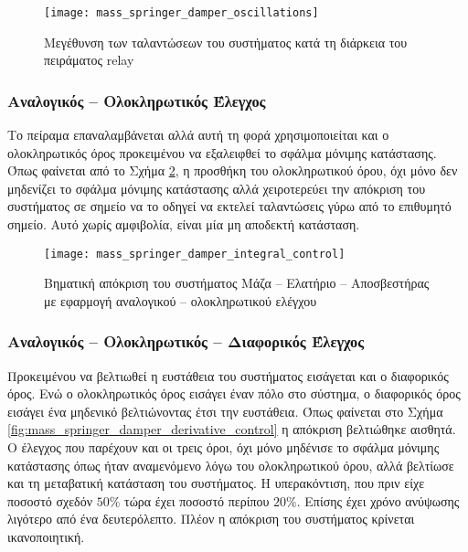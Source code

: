\begin{figure}[h]
  \centering
  \texttt{[image: mass\_springer\_damper\_oscillations]}
  \caption{Μεγέθυνση των ταλαντώσεων του συστήματος κατά τη διάρκεια του πειράματος relay}
  \label{fig:mass_springer_damper_oscillations}
\end{figure}

\subsubsection{Αναλογικός -- Ολοκληρωτικός Έλεγχος}

Το πείραμα επαναλαμβάνεται αλλά αυτή τη φορά χρησιμοποιείται και ο ολοκληρωτικός όρος προκειμένου να εξαλειφθεί το σφάλμα μόνιμης κατάστασης. Όπως φαίνεται από το Σχήμα \ref{fig:mass_springer_damper_integral_control}, η προσθήκη του ολοκληρωτικού όρου, όχι μόνο δεν μηδενίζει το σφάλμα μόνιμης κατάστασης αλλά χειροτερεύει την απόκριση του συστήματος σε σημείο να το οδηγεί να εκτελεί ταλαντώσεις γύρω από το επιθυμητό σημείο. Αυτό χωρίς αμφιβολία, είναι μία μη αποδεκτή κατάσταση.

\begin{figure}[h]
  \centering
  \texttt{[image: mass\_springer\_damper\_integral\_control]}
  \caption{Βηματική απόκριση του συστήματος Μάζα -- Ελατήριο -- Αποσβεστήρας με εφαρμογή αναλογικού -- ολοκληρωτικού ελέγχου}
  \label{fig:mass_springer_damper_integral_control}
\end{figure}

\subsubsection{Αναλογικός -- Ολοκληρωτικός -- Διαφορικός Έλεγχος}

Προκειμένου να βελτιωθεί η ευστάθεια του συστήματος εισάγεται και ο διαφορικός όρος. Ενώ ο ολοκληρωτικός όρος εισάγει έναν πόλο στο σύστημα, ο διαφορικός όρος εισάγει ένα μηδενικό βελτιώνοντας έτσι την ευστάθεια. Όπως φαίνεται στο Σχήμα \ref{fig:mass_springer_damper_derivative_control} η απόκριση βελτιώθηκε αισθητά. Ο έλεγχος που παρέχουν και οι τρεις όροι, όχι μόνο μηδένισε το σφάλμα μόνιμης κατάστασης όπως ήταν αναμενόμενο λόγω του ολοκληρωτικού όρου, αλλά βελτίωσε και τη μεταβατική κατάσταση του συστήματος. Η υπερακόντιση, που πριν είχε ποσοστό σχεδόν $50\%$ τώρα έχει ποσοστό περίπου $20\%$. Επίσης έχει χρόνο ανύψωσης λιγότερο από ένα δευτερόλεπτο. Πλέον η απόκριση του συστήματος κρίνεται ικανοποιητική.

